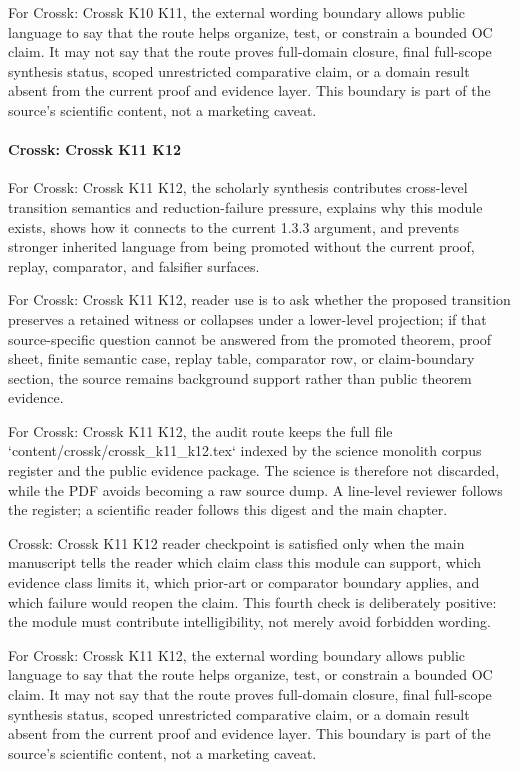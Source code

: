 For Crossk: Crossk K10 K11, the external wording boundary allows public language to say that the route helps organize, test, or constrain a bounded OC claim. It may not say that the route proves full-domain closure, final full-scope synthesis status, scoped unrestricted comparative claim, or a domain result absent from the current proof and evidence layer. This boundary is part of the source's scientific content, not a marketing caveat.


\paragraph{Crossk: Crossk K11 K12}

For Crossk: Crossk K11 K12, the scholarly synthesis contributes cross-level transition semantics and reduction-failure pressure, explains why this module exists, shows how it connects to the current 1.3.3 argument, and prevents stronger inherited language from being promoted without the current proof, replay, comparator, and falsifier surfaces.


For Crossk: Crossk K11 K12, reader use is to ask whether the proposed transition preserves a retained witness or collapses under a lower-level projection; if that source-specific question cannot be answered from the promoted theorem, proof sheet, finite semantic case, replay table, comparator row, or claim-boundary section, the source remains background support rather than public theorem evidence.


For Crossk: Crossk K11 K12, the audit route keeps the full file `content/crossk/crossk\_k11\_k12.tex` indexed by the science monolith corpus register and the public evidence package. The science is therefore not discarded, while the PDF avoids becoming a raw source dump. A line-level reviewer follows the register; a scientific reader follows this digest and the main chapter.


Crossk: Crossk K11 K12 reader checkpoint is satisfied only when the main manuscript tells the reader which claim class this module can support, which evidence class limits it, which prior-art or comparator boundary applies, and which failure would reopen the claim. This fourth check is deliberately positive: the module must contribute intelligibility, not merely avoid forbidden wording.


For Crossk: Crossk K11 K12, the external wording boundary allows public language to say that the route helps organize, test, or constrain a bounded OC claim. It may not say that the route proves full-domain closure, final full-scope synthesis status, scoped unrestricted comparative claim, or a domain result absent from the current proof and evidence layer. This boundary is part of the source's scientific content, not a marketing caveat.


